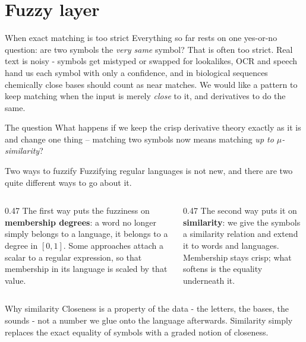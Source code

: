 \documentclass[aspectratio=169]{beamer}
\newcommand{\cut}{\mu}
\begin{document}
\section{Fuzzy layer}

\begin{frame}{When exact matching is too strict}
  Everything so far rests on one yes-or-no question: are two symbols the
  \emph{very same} symbol? That is often too strict. Real text is noisy -
  symbols get mistyped or swapped for lookalikes, OCR and speech hand us each
  symbol with only a confidence, and in biological sequences chemically close
  bases should count as near matches.
  \vfill
  We would like a pattern to keep matching when the input is merely
  \emph{close} to it, and derivatives to do the same.
  \vfill
  \begin{block}{The question}
    What happens if we keep the crisp derivative theory exactly as it is and
    change one thing -- matching two symbols now means matching \emph{up to
    $\cut$-similarity}?
  \end{block}
\end{frame}

\begin{frame}{Two ways to fuzzify}
  Fuzzifying regular languages is not new, and there are two quite different
  ways to go about it.
  \vfill
  \begin{columns}[T,onlytextwidth]
    \begin{column}{0.47\textwidth}
      The first way puts the fuzziness on \textbf{membership degrees}: a word no
      longer simply belongs to a language, it belongs to a degree in $[0,1]$.
      Some approaches attach a scalar to a regular expression, so that membership
      in its language is scaled by that value.
    \end{column}
    \begin{column}{0.47\textwidth}
      The second way puts it on \textbf{similarity}: we give the symbols a
      similarity relation and extend it to words and languages. Membership stays
      crisp; what softens is the equality underneath it.
    \end{column}
  \end{columns}
  \vfill
  \begin{block}{Why similarity}
    Closeness is a property of the data - the letters, the bases, the sounds -
    not a number we glue onto the language afterwards. Similarity simply replaces
    the exact equality of symbols with a graded notion of closeness.
  \end{block}
\end{frame}
\end{document}
